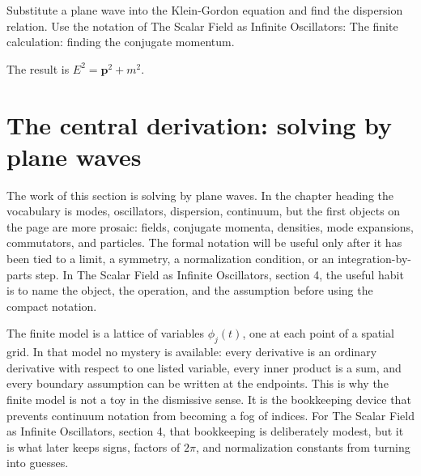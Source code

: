 \begin{exercise}
Substitute a plane wave into the Klein-Gordon equation and find the dispersion relation.  Use the notation of The Scalar Field as Infinite Oscillators: The finite calculation: finding the conjugate momentum.
\begin{answer}
The result is \(E^2=\bm p^2+m^2\).
\end{answer}
\end{exercise}



\section{The central derivation: solving by plane waves}













The work of this section is solving by plane waves.  In the chapter heading the vocabulary is modes, oscillators, dispersion, continuum, but the first objects on the page are more prosaic: fields, conjugate momenta, densities, mode expansions, commutators, and particles.  The formal notation will be useful only after it has been tied to a limit, a symmetry, a normalization condition, or an integration-by-parts step.  In The Scalar Field as Infinite Oscillators, section 4, the useful habit is to name the object, the operation, and the assumption before using the compact notation.

The finite model is a lattice of variables \(\phi_j(t)\), one at each point of a spatial grid.  In that model no mystery is available: every derivative is an ordinary derivative with respect to one listed variable, every inner product is a sum, and every boundary assumption can be written at the endpoints.  This is why the finite model is not a toy in the dismissive sense.  It is the bookkeeping device that prevents continuum notation from becoming a fog of indices.  For The Scalar Field as Infinite Oscillators, section 4, that bookkeeping is deliberately modest, but it is what later keeps signs, factors of \(2\pi\), and normalization constants from turning into guesses.

